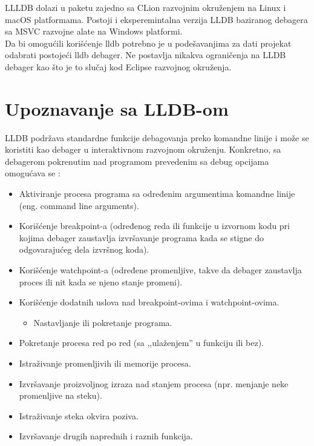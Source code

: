 \documentclass[a4paper]{article}
\begin{document}
LLLDB dolazi u paketu zajedno sa CLion razvojnim okruženjem na Linux i macOS platformama. Postoji i eksperemintalna verzija LLDB baziranog debagera sa MSVC razvojne alate na Windows platformi. \\
\indent Da bi omogućili korišćenje lldb potrebno je u podešavanjima za dati projekat odabrati postojeći lldb debager. 
Ne postavlja nikakva ograničenja na LLDB debager kao što je to slučaj kod Eclipse razvojnog okruženja.


\section{Upoznavanje sa LLDB-om}
LLDB podržava standardne funkcije debagovanja preko komandne linije i može se
koristiti kao debager u interaktivnom razvojnom okruženju. Konkretno, sa
debagerom pokrenutim nad programom prevedenim sa debug opcijama omogućava
se \cite{lldb_to_gdb_map}:

\begin{itemize}
\item{Aktiviranje procesa programa sa određenim argumentima komandne linije
(eng. command line arguments).}

\item{Korišćenje breakpoint-a (određenog reda ili funkcije u izvornom kodu pri
  kojima debager zaustavlja izvršavanje programa kada se stigne do odgovarajućeg
  dela izvršnog koda).}
  
\item{Korišćenje watchpoint-a (određene promenljive, takve da debager zaustavlja
proces ili nit kada se njeno stanje promeni).}

\item{Korišćenje dodatnih uslova nad breakpoint-ovima i watchpoint-ovima.}
  \begin{itemize}
  \item{Nastavljanje ili pokretanje programa.}
  \end{itemize}

\item{Pokretanje procesa red po red (sa ,,ulaženjem'' u funkciju ili bez).}

\item{Istraživanje promenljivih ili memorije procesa.}

\item{Izvršavanje proizvoljnog izraza nad stanjem procesa (npr. menjanje neke
promenljive na steku).}

\item{Istraživanje steka okvira poziva.}

\item{Izvršavanje drugih naprednih i raznih funkcija.}
\end{itemize}
\end{document}

